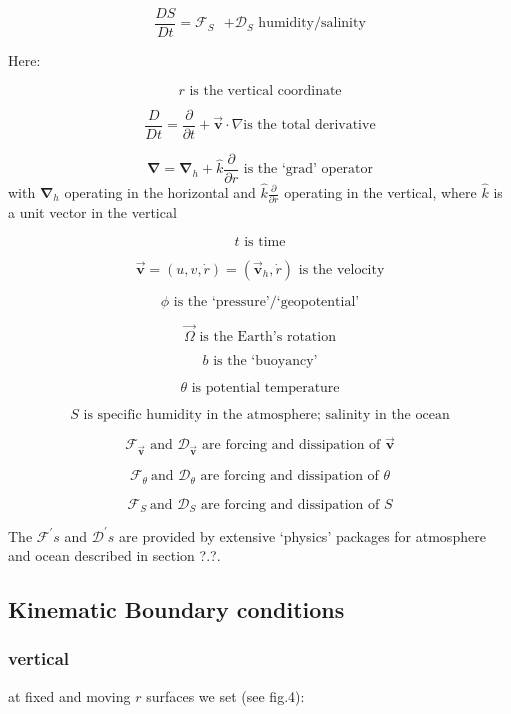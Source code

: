 \[
\frac{DS}{Dt}=\mathcal{F}_{S}\text{ }\mathcal{+D}_{S}\text{ humidity/salinity
} 
\]

Here:

\[
r\text{ is the vertical coordinate} 
\]

\[
\frac{D}{Dt}=\frac{\partial }{\partial t}+\vec{\mathbf{v}}\cdot \nabla \text{
is the total derivative} 
\]

\[
\mathbf{\nabla }=\mathbf{\nabla }_{h}+\widehat{k}\frac{\partial }{\partial r}
\text{ is the `grad' operator} 
\]
with $\mathbf{\nabla }_{h}$ operating in the horizontal and $\widehat{k}
\frac{\partial }{\partial r}$ operating in the vertical, where $\widehat{k}$
is a unit vector in the vertical

\[
t\text{ is time} 
\]

\[
\vec{\mathbf{v}}=(u,v,\dot{r})=(\vec{\mathbf{v}}_{h},\dot{r})\text{ is the
velocity} 
\]

\[
\phi \text{ is the `pressure'/`geopotential'} 
\]

\[
\vec{\Omega}\text{ is the Earth's rotation} 
\]

\[
b\text{ is the `buoyancy'} 
\]

\[
\theta \text{ is potential temperature} 
\]

\[
S\text{ is specific humidity in the atmosphere; salinity in the ocean} 
\]

\[
\mathcal{F}_{\vec{\mathbf{v}}}\text{ and }\mathcal{D}_{\vec{\mathbf{v}}}
\text{ are forcing and dissipation of }\vec{\mathbf{v}} 
\]

\[
\mathcal{F}_{\theta }\mathcal{\ }\text{and }\mathcal{D}_{\theta }\text{ are
forcing and dissipation of }\theta 
\]

\[
\mathcal{F}_{S}\mathcal{\ }\text{and }\mathcal{D}_{S}\text{ are forcing and
dissipation of }S 
\]

The $\mathcal{F}^{\prime }s$ and $\mathcal{D}^{\prime }s$ are provided by
extensive `physics' packages for atmosphere and ocean described in section
?.?.

\subsection{Kinematic Boundary conditions}

\subsubsection{vertical}

at fixed and moving $r$ surfaces we set (see fig.4):

